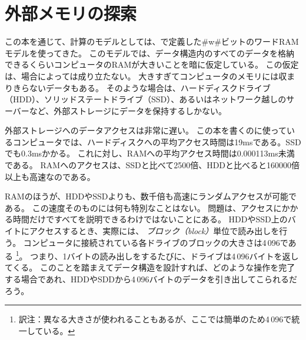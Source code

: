 \chapter{外部メモリの探索}
この本を通じて、計算のモデルとしては、で定義した#w#ビットのワードRAMモデルを使ってきた。
このモデルでは、データ構造内のすべてのデータを格納できるくらいコンピュータのRAMが大きいことを暗に仮定している。
この仮定は、場合によっては成り立たない。
大きすぎてコンピュータのメモリには収まりきらないデータもある。
そのような場合は、ハードディスクドライブ（HDD）、ソリッドステートドライブ（SSD）、あるいはネットワーク越しのサーバーなど、外部ストレージにデータを保持するしかない。

%
%
%
%
外部ストレージへのデータアクセスは非常に遅い。
この本を書くのに使っているコンピュータでは、ハードディスクへの平均アクセス時間は19msである。SSDでも0.3msかかる。
これに対し、RAMへの平均アクセス時間は0.000113ms未満である。
RAMへのアクセスは、SSDと比べて2500倍、HDDと比べると160000倍以上も高速なのである。

% 
% 

RAMのほうが、HDDやSSDよりも、数千倍も高速にランダムアクセスが可能である。
この速度そのものには何も特別なことはない。
問題は、アクセスにかかる時間だけですべてを説明できるわけではないことにある。
HDDやSSD上のバイトにアクセスするとき、実際には、
\emph{ブロック（block）}単位で読み出しを行う。
%
コンピュータに接続されている各ドライブのブロックの大きさは4\,096である
\footnote{訳注：異なる大きさが使われることもあるが、ここでは簡単のため4\,096で統一している。}。
つまり、1バイトの読み出しをするたびに、ドライブは4\,096バイトを返してくる。
このことを踏まえてデータ構造を設計すれば、どのような操作を完了する場合であれ、HDDやSDDから4\,096バイトのデータを引き出してこられるだろう。

